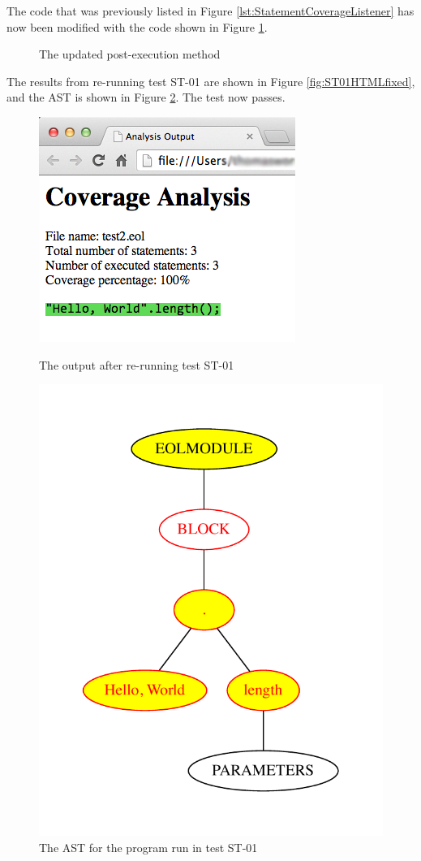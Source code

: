 The code that was previously listed in Figure \ref{lst:StatementCoverageListener} has now been modified with the code shown in Figure \ref{lst:StatementCoverageST01Mod}.

\begin{figure}
	
	\caption{The updated post-execution method}
	\label{lst:StatementCoverageST01Mod}
\end{figure}

The results from re-running test ST-01 are shown in Figure \ref{fig:ST01HTMLfixed}, and the AST is shown in Figure \ref{fig:ST01ASTfixed}. The test now passes.

\begin{figure}
\centering
\begin{minipage}[b]{.44\textwidth}
  \centering
  \includegraphics[width=0.6\linewidth]{figures/ST01HTML_fixed.png}
  \caption{The output after re-running test ST-01}
  \label{fig:ST01HTMLfixed}
\end{minipage}%
\begin{minipage}[b]{.1\textwidth}
\hspace{3.00mm}
\end{minipage}
\begin{minipage}[b]{.4\textwidth}
  \centering
  \includegraphics[width=0.6\linewidth]{figures/ST01AST_fixed.pdf}
  \caption{The AST for the program run in test ST-01}
  \label{fig:ST01ASTfixed}
\end{minipage}
\end{figure}

